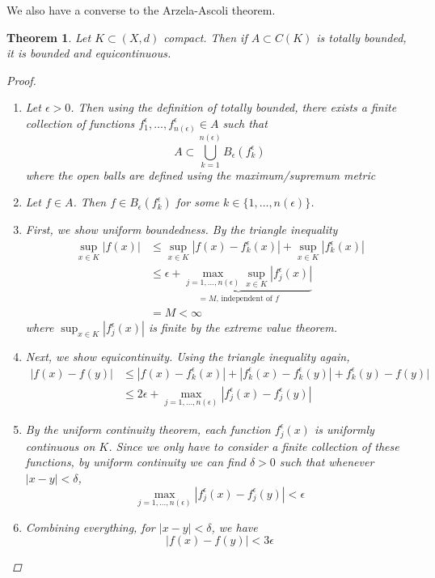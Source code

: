\documentclass[10pt]{article}         %
\newtheorem{theorem}{Theorem}[section]
\theoremstyle{remark}
\begin{document}
We also have a converse to the Arzela-Ascoli theorem.
\begin{theorem} Let $K \subset (X, d)$ compact. Then if $A \subset C(K)$ is totally bounded, it is bounded and equicontinuous.
\begin{proof}
\begin{enumerate}
\item Let $\epsilon > 0$. Then using the definition of totally bounded, there exists a finite collection of functions $f_1^{\epsilon}, \dots, f_{n(\epsilon)}^{\epsilon} \in A$ such that 
\[
A \subset \bigcup_{k=1}^{n(\epsilon)} B_{\epsilon}(f_k^{\epsilon})
\]
where the open balls are defined using the maximum/supremum metric
\item Let $f \in A$. Then $f \in B_{\epsilon} (f_k^\epsilon)$ for some $k \in \{1, \dots, n(\epsilon)\}$. 
\item First, we show uniform boundedness. By the triangle inequality
\begin{align*}
\sup_{x \in K}|f(x)| &\leq \sup_{x \in K}|f(x) - f_k^\epsilon(x)| +  \sup_{x \in K}|f_k^\epsilon(x)| \\
&\leq \underbrace{ \epsilon + \max_{j = 1, \dots, n(\epsilon)} \sup_{x \in K}|f_j^\epsilon(x)| }_{=M\text{, independent of $f$}} \\
&= M < \infty
\end{align*}
where $\sup_{x \in K}|f_j^\epsilon(x)|$ is finite by the extreme value theorem.
\item Next, we show equicontinuity. Using the triangle inequality again,
\begin{align*}
|f(x) - f(y)| &\leq |f(x) - f_k^\epsilon(x)| + |f_k^\epsilon(x) - f_k^\epsilon(y)| + f_k^\epsilon(y) - f(y)| \\
&\leq 2 \epsilon + \max_{j = 1, \dots, n(\epsilon)}|f_j^\epsilon(x) - f_j^\epsilon(y)|
\end{align*}
\item By the uniform continuity theorem, each function $f_j^\epsilon(x)$ is uniformly continuous on $K$. Since we only have to consider a finite collection of these functions, by uniform continuity we can find $\delta > 0$ such that whenever $|x - y| < \delta$,
\[
\max_{j = 1, \dots, n(\epsilon)}|f_j^\epsilon(x) - f_j^\epsilon(y)| < \epsilon
\]
\item Combining everything, for $|x - y| < \delta$, we have
\[
|f(x) - f(y)| < 3 \epsilon
\]
\end{enumerate}
\end{proof}
\end{theorem}
\end{document}
